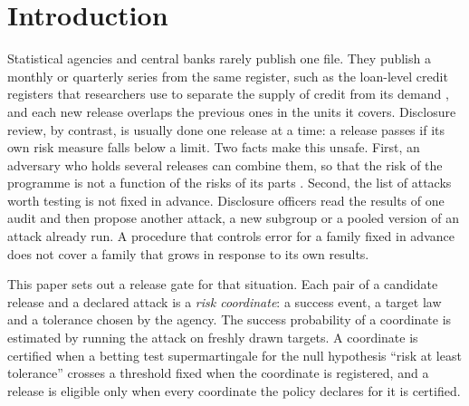 \documentclass{jpc}
\theoremstyle{remark}
\begin{document}
\renewcommand{\thefootnote}{\fnsymbol{footnote}}
\renewcommand{\thefootnote}{\arabic{footnote}}

\section{Introduction}\label{sec:intro}
Statistical agencies and central banks rarely publish one file. They publish a monthly or quarterly series from the same register, such as the loan-level credit registers that researchers use to separate the supply of credit from its demand \cite{khwaja2008}, and each new release overlaps the previous ones in the units it covers. Disclosure review, by contrast, is usually done one release at a time: a release passes if its own risk measure falls below a limit. Two facts make this unsafe. First, an adversary who holds several releases can combine them, so that the risk of the programme is not a function of the risks of its parts \cite{sweeney2002,ganta2008}. Second, the list of attacks worth testing is not fixed in advance. Disclosure officers read the results of one audit and then propose another attack, a new subgroup or a pooled version of an attack already run. A procedure that controls error for a family fixed in advance does not cover a family that grows in response to its own results.

This paper sets out a release gate for that situation. Each pair of a candidate release and a declared attack is a \emph{risk coordinate}: a success event, a target law and a tolerance chosen by the agency. The success probability of a coordinate is estimated by running the attack on freshly drawn targets. A coordinate is certified when a betting test supermartingale for the null hypothesis ``risk at least tolerance'' crosses a threshold fixed when the coordinate is registered, and a release is eligible only when every coordinate the policy declares for it is certified.
\end{document}
